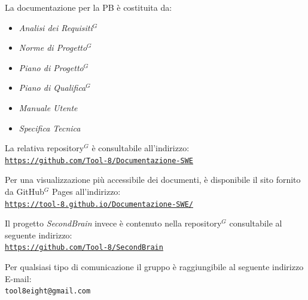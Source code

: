 \documentclass[a4paper,10pt]{article}
\begin{document}
\vspace{1\baselineskip}

La documentazione per la PB è costituita da:
\begin{itemize}
  \item \textit{Analisi dei Requisiti$^G$}
  \item \textit{Norme di Progetto$^G$}
  \item \textit{Piano di Progetto$^G$}
  \item \textit{Piano di Qualifica$^G$}
  \item \textit{Manuale Utente}
  \item \textit{Specifica Tecnica}
\end{itemize}
La relativa repository$^G$ è consultabile all'indirizzo:\\
\href{https://github.com/Tool-8/Documentazione-SWE}{\underline{\texttt{https://github.com/Tool-8/Documentazione-SWE}}}

\vspace{1\baselineskip}

Per una visualizzazione più accessibile dei documenti, è disponibile il sito fornito da GitHub$^G$ Pages all'indirizzo:\\ \href{https://tool-8.github.io/Documentazione-SWE/}{\underline{\texttt{https://tool-8.github.io/Documentazione-SWE/}}}

\vspace{2\baselineskip}

Il progetto \textit{SecondBrain} invece è contenuto nella repository$^G$ consultabile al seguente indirizzo:\\
\href{https://github.com/Tool-8/SecondBrain}{\underline{\texttt{https://github.com/Tool-8/SecondBrain}}}

\vspace{3\baselineskip}

Per qualsiasi tipo di comunicazione il gruppo è raggiungibile al seguente indirizzo E-mail:\\
\texttt{tool8eight@gmail.com}
\end{document}
